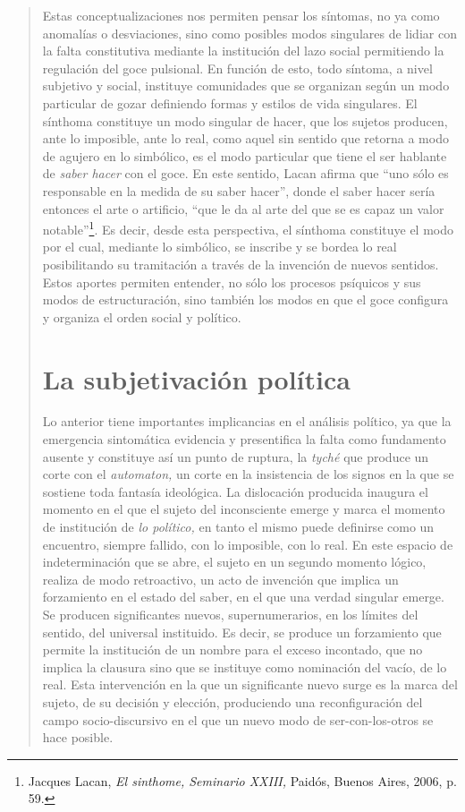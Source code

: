 \begin{quote}
Estas conceptualizaciones nos permiten pensar los síntomas, no ya como anomalías o desviaciones, sino como posibles modos singulares de lidiar con la falta constitutiva mediante la institución del lazo social permitiendo la regulación del goce pulsional. En función de esto, todo síntoma, a nivel subjetivo y social, instituye comunidades que se organizan según un modo particular de gozar definiendo formas y estilos de vida singulares. El sínthoma constituye un modo singular de hacer, que los sujetos producen, ante lo imposible, ante lo real, como aquel sin sentido que retorna a modo de agujero en lo simbólico, es el modo particular que tiene el ser hablante de \emph{saber hacer} con el goce. En este sentido, Lacan afirma que \enquote{uno sólo es responsable en la medida de su saber hacer}, donde el saber hacer sería entonces el arte o artificio, \enquote{que le da al arte del que se es capaz un valor notable}\footnote{Jacques Lacan, \emph{El sinthome, Seminario XXIII,} Paidós, Buenos Aires, 2006, p. 59.}. Es decir, desde esta perspectiva, el sínthoma constituye el modo por el cual, mediante lo simbólico, se inscribe y se bordea lo real posibilitando su tramitación a través de la invención de nuevos sentidos. Estos aportes permiten entender, no sólo los procesos psíquicos y sus modos de estructuración, sino también los modos en que el goce configura y organiza el orden social y político.

\section{La subjetivación política}

Lo anterior tiene importantes implicancias en el análisis político, ya que la emergencia sintomática evidencia y presentifica la falta como fundamento ausente y constituye así un punto de ruptura, la \emph{tyché} que produce un corte con el \emph{automaton,} un corte en la insistencia de los signos en la que se sostiene toda fantasía ideológica. La dislocación producida inaugura el momento en el que el sujeto del inconsciente emerge y marca el momento de institución de \emph{lo político,} en tanto el mismo puede definirse como un encuentro, siempre fallido, con lo imposible, con lo real. En este espacio de indeterminación que se abre, el sujeto en un segundo momento lógico, realiza de modo retroactivo, un acto de invención que implica un forzamiento en el estado del saber, en el que una verdad singular emerge. Se producen significantes nuevos, supernumerarios, en los límites del sentido, del universal instituido. Es decir, se produce un forzamiento que permite la institución de un nombre para el exceso incontado, que no implica la clausura sino que se instituye como nominación del vacío, de lo real. Esta intervención en la que un significante nuevo surge es la marca del sujeto, de su decisión y elección, produciendo una reconfiguración del campo socio-discursivo en el que un nuevo modo de ser-con-los-otros se hace posible.


\end{quote}
